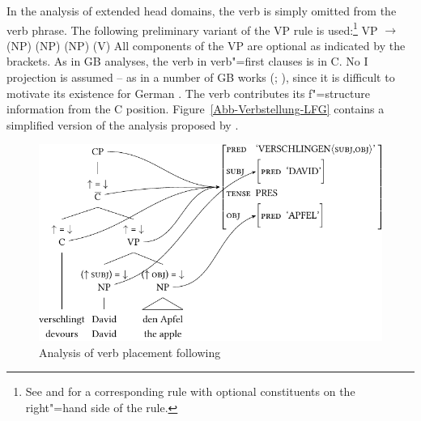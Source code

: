 \noindent
In the analysis of extended head domains, the verb is simply omitted from the verb phrase. The following preliminary variant of the VP rule is used:\footnote{
See  and  for a corresponding rule with optional constituents on the right"=hand side of the rule.
}
\ea
\label{Regel-LFG-VP-alles-optional}
VP $\to$ (NP) (NP) (NP) (V)
\z
All components of the VP are optional as indicated by the brackets. As in GB analyses, the verb in
verb"=first clauses is in C. No I projection is assumed -- as in a number of GB works 
(\citealp{Haider93a,Haider95b-u,Haider97a}; \citealp[Section~IV.3]{Sternefeld2006a-u}), since it is difficult to motivate its existence for German
\citep[Section~3.2.2]{Berman2003a}. The verb contributes its f"=structure information from the C position. Figure~\vref{Abb-Verbstellung-LFG} contains a simplified version of the
analysis proposed by \citet[]{Berman2003a}.
 
\begin{figure}
\centerline{%
\includegraphics{Figures/verschlingt-david-den-apfel-lfg-lsp-crop}
}
\caption{\label{Abb-Verbstellung-LFG}Analysis of verb placement following \citet[]{Berman2003a}}
\end{figure}%

